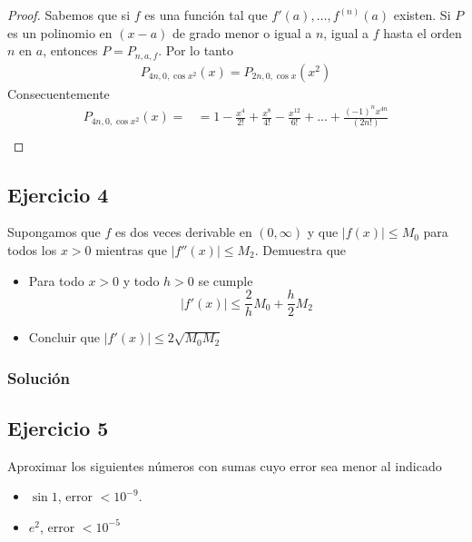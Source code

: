 \documentclass[a4paper]{article}
\begin{document}
\begin{proof}
    Sabemos que si \(f\) es una función tal que \(f'(a), \dotsc, f^{(n)}(a)\) existen. Si 
    \(P\) es un polinomio en \((x-a)\) de grado menor o igual a \(n\), igual a \(f\) 
    hasta el orden \(n\) en \(a\), entonces \(P = P_{n, a, f}\).
    Por lo tanto 
    \begin{align*}
        P_{4n, 0, \cos{x^2}}(x) = P_{2n, 0, \cos{x}}(x^2)
    \end{align*}
    Consecuentemente 
    \begin{align*}
        P_{4n, 0, \cos{x^2}}(x) = &= 1 - \frac{x^4}{2!} + \frac{x^8}{4!} - \frac{x^{12}}{6!} + \dotsc + \frac{(-1)^{n}x^{4n}}{(2n!)} \\
    \end{align*}
\end{proof}
\subsection{Ejercicio 4}
\noindent
Supongamos que \(f\) es dos veces derivable en \((0, \infty)\) y que \(|f(x)| \leq M_{0}\) para 
todos  los \(x > 0\) mientras que \(|f''(x)| \leq M_{2}\). Demuestra que
\begin{itemize}
    \item Para todo \(x > 0\) y todo \(h > 0\) se cumple
    \[
        |f'(x)| \leq \frac{2}{h}M_{0} + \frac{h}{2}M_{2}
    \]
    \item Concluir que \(|f'(x)| \leq 2 \sqrt{M_{0}M_{2}}\)
\end{itemize}
\subsubsection*{Solución}
\subsection{Ejercicio 5}
\noindent
Aproximar los siguientes números con sumas cuyo error sea menor al indicado
\begin{itemize}
    \item \(\sin{1}\), error \(< 10^{-9}\).
    \item \(e^{2}\), error \(< 10^{-5}\)
\end{itemize}
\end{document}
